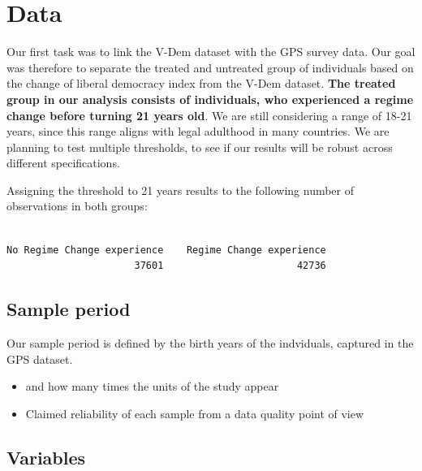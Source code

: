 \documentclass[
  letterpaper,
  DIV=11,
  numbers=noendperiod]{scrartcl}
\newenvironment{Shaded}{\begin{snugshade}}{\end{snugshade}}
\newcommand{\FunctionTok}[1]{\textcolor[rgb]{0.28,0.35,0.67}{#1}}
\newcommand{\NormalTok}[1]{\textcolor[rgb]{0.00,0.23,0.31}{#1}}
\newcommand{\SpecialCharTok}[1]{\textcolor[rgb]{0.37,0.37,0.37}{#1}}
\begin{document}
\hypertarget{data}{%
\section{Data}\label{data}}

Our first task was to link the V-Dem dataset with the GPS survey data.
Our goal was therefore to separate the treated and untreated group of
individuals based on the change of liberal democracy index from the
V-Dem dataset. \textbf{The treated group in our analysis consists of
individuals, who experienced a regime change before turning 21 years
old}. We are still considering a range of 18-21 years, since this range
aligns with legal adulthood in many countries. We are planning to test
multiple thresholds, to see if our results will be robust across
different specifications.

Assigning the threshold to 21 years results to the following number of
observations in both groups:

\begin{Shaded}
\end{Shaded}

\begin{verbatim}

No Regime Change experience    Regime Change experience 
                      37601                       42736 
\end{verbatim}

\hypertarget{sample-period}{%
\subsection{Sample period}\label{sample-period}}

Our sample period is defined by the birth years of the indviduals,
captured in the GPS dataset.

\begin{itemize}
\item
  and how many times the units of the study appear
\item
  Claimed reliability of each sample from a data quality point of view
\end{itemize}

\hypertarget{variables}{%
\subsection{Variables}\label{variables}}
\end{document}
